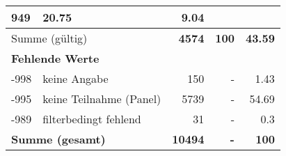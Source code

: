 \begin{longtable}{lXrrr}
       \num{949} &
       \num[round-mode=places,round-precision=2]{20.75} &
         \num[round-mode=places,round-precision=2]{9.04} \\
     \midrule
     \multicolumn{2}{l}{Summe (gültig)} &
       \textbf{\num{4574}} &
     \textbf{\num{100}} &
       \textbf{\num[round-mode=places,round-precision=2]{43.59}} \\
     \multicolumn{5}{l}{\textbf{Fehlende Werte}}\\
       -998 &
       keine Angabe &
         \num{150} &
        - &
         \num[round-mode=places,round-precision=2]{1.43} \\
       -995 &
       keine Teilnahme (Panel) &
         \num{5739} &
        - &
         \num[round-mode=places,round-precision=2]{54.69} \\
       -989 &
       filterbedingt fehlend &
         \num{31} &
        - &
         \num[round-mode=places,round-precision=2]{0.3} \\
     \midrule
     \multicolumn{2}{l}{\textbf{Summe (gesamt)}} &
          \textbf{\num{10494}} &
        \textbf{-} &
        \textbf{\num{100}} \\
     \bottomrule
     \end{longtable}
     
